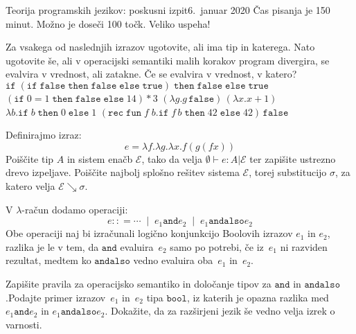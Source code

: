 \documentclass[arhiv]{izpit}
\begin{document}
\newcommand{\bnfis}{\mathrel{{:}{:}{=}}}
\newcommand{\bnfor}{\;\mid\;}
\newcommand{\fun}[2]{\lambda #1. #2}
\newcommand{\conditional}[3]{\mathtt{if}\;#1\;\mathtt{then}\;#2\;\mathtt{else}\;#3}
\newcommand{\recfun}[3]{\mathtt{rec}\;\mathtt{fun}\;#1\;#2. #3}
\newcommand{\tru}{\mathtt{true}}
\newcommand{\fls}{\mathtt{false}}
\newcommand{\tbool}{\mathtt{bool}}
\newcommand{\tand}{\mathbin{\mathtt{and}}}
\newcommand{\tandalso}{\mathbin{\mathtt{andalso}}}

\izpit
  {Teorija programskih jezikov: poskusni izpit}{6.\ januar 2020}{
  Čas pisanja je 150 minut. Možno je doseči 100 točk. Veliko uspeha!
}


\naloga[\tocke{25}]
Za vsakega od naslednjih izrazov ugotovite, ali ima tip in katerega. Nato ugotovite še, ali v operacijski semantiki malih korakov program divergira, se evalvira v vrednost, ali zatakne. Če se evalvira v vrednost, v katero?
\podnaloga $\conditional{(\conditional{\fls}{\fls}{\tru})}{\fls}{\tru}$ \prostor
\podnaloga $(\conditional{0=1}{\fls}{14}) * 3$ \prostor
\podnaloga $(\fun{g}{g \, \fls}) \, (\fun{x}{x + 1})$ \prostor
\podnaloga $\fun{b}{\conditional{b}{0}{1}}$ \prostor
\podnaloga $(\recfun{f}{b}{\conditional{f \, b}{42}{42}}) \, \fls$ \prostor


\naloga[\tocke{25}]
Definirajmo izraz:
\[
  e = \fun{f}{\fun{g}{\fun{x}{f(g(f x))}}}
\]
\podnaloga Poiščite tip $A$ in sistem enačb $\mathcal{E}$, tako da velja $\emptyset \vdash e : A | \mathcal{E}$ ter zapišite ustrezno drevo izpeljave.
\prostor[3]
\podnaloga Poiščite najbolj splošno rešitev sistema $\mathcal{E}$, torej substitucijo $\sigma$, za katero velja $\mathcal{E} \searrow \sigma$.\prostor



\naloga[\tocke{25}]
V $\lambda$-račun dodamo operaciji:
\[
  e \bnfis \cdots \bnfor
  e_1 \tand e_2 \bnfor
  e_1 \tandalso e_2
\]
Obe operaciji naj bi izračunali logično konjunkcijo Boolovih izrazov $e_1$ in $e_2$, razlika je le v tem, da $\mathtt{and}$ evaluira~$e_2$ samo po potrebi, če iz~$e_1$ ni razviden rezultat, medtem ko $\mathtt{andalso}$ vedno evaluira oba~$e_1$ in~$e_2$.

\podnaloga Zapišite pravila za operacijsko semantiko in določanje tipov za $\mathtt{and}$ in $\mathtt{andalso}$.\prostor[2]
\podnaloga Podajte primer izrazov~$e_1$ in~$e_2$ tipa $\tbool$,
  iz katerih je opazna razlika med $e_1 \tand e_2$ in $e_1 \tandalso e_2$.\prostor
\podnaloga Dokažite, da za razširjeni jezik še vedno velja izrek o varnosti.\prostor[2]
\end{document}
